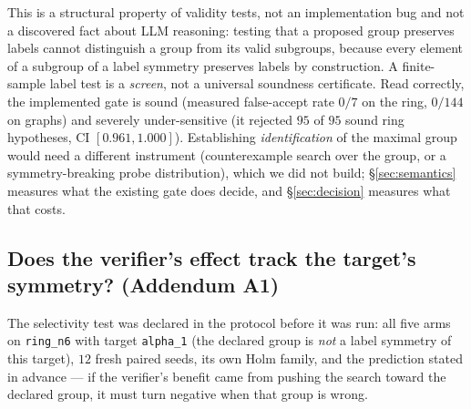 \documentclass{neurips_2024}
\begin{document}
This is a structural property of validity tests, not an implementation bug and not a
discovered fact about LLM reasoning: testing that a proposed group preserves labels cannot
distinguish a group from its valid subgroups, because every element of a subgroup of a label
symmetry preserves labels by construction. A finite-sample label test is a \emph{screen}, not
a universal soundness certificate. Read correctly, the implemented gate is sound (measured
false-accept rate $0/7$ on the ring, $0/144$ on graphs) and severely under-sensitive (it
rejected $95$ of $95$ sound ring hypotheses, CI $[0.961,1.000]$). Establishing
\emph{identification} of the maximal group would need a different instrument (counterexample
search over the group, or a symmetry-breaking probe distribution), which we did not build;
\S\ref{sec:semantics} measures what the existing gate does decide, and \S\ref{sec:decision}
measures what that costs.

\subsection{Does the verifier's effect track the target's symmetry? (Addendum A1)}
\label{sec:breaking}

The selectivity test was declared in the protocol before it was run: all five arms on
\texttt{ring\_n6} with target \texttt{alpha\_1} (the declared group is \emph{not} a label
symmetry of this target), $12$ fresh paired seeds, its own Holm family, and the prediction
stated in advance --- if the verifier's benefit came from pushing the search toward the
declared group, it must turn negative when that group is wrong.
\end{document}
